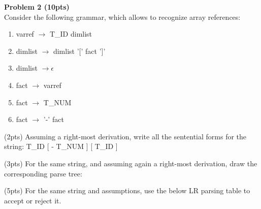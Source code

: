 
\noindent
{\bf Problem 2 (10pts)}\\

Consider the following grammar, which allows to recognize array references:
\\

\begin{enumerate}
\item
 varref $\rightarrow$ T\_ID dimlist 
\item
 dimlist $\rightarrow$ dimlist '[' fact ']' 
\item
 dimlist $\rightarrow         \epsilon$
\item
 fact $\rightarrow$ varref 
\item
 fact $\rightarrow$ T\_NUM 
\item
fact  $\rightarrow$ '-' fact 
\end{enumerate}


\vspace{1cm}

\noindent
(2pts) Assuming a right-most derivation, write all the sentential forms for the string: T\_ID [ - T\_NUM ] [ T\_ID ]

\vspace{3in}

\noindent
(3pts) For the same string, and assuming again a right-most derivation, draw the corresponding parse tree:

\vspace{4in}



\pagebreak
\noindent
(5pts) For the same string and assumptions, use the below LR parsing table to accept or reject it.

\vspace{0.5cm}

